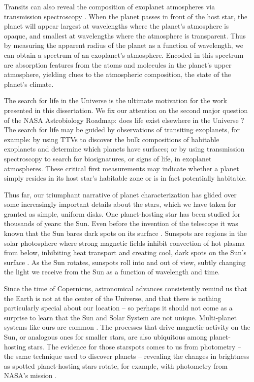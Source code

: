 Transits can also reveal the composition of exoplanet atmospheres via transmission spectroscopy \citep{Seager2000}. When the planet passes in front of the host star, the planet will appear largest at wavelengths where the planet's atmosphere is opaque, and smallest at wavelengths where the atmosphere is transparent. Thus by measuring the apparent radius of the planet as a function of wavelength, we can obtain a spectrum of an exoplanet's atmosphere. Encoded in this spectrum are absorption features from the atoms and molecules in the planet's upper atmosphere, yielding clues to the atmospheric composition, the state of the planet's climate. 

The search for life in the Universe is the ultimate motivation for the work presented in this dissertation. We fix our  attention on the second major question of the NASA Astrobiology Roadmap: does life exist elsewhere in the Universe \citep{DesMarais2008}? The search for life may be guided by observations of transiting exoplanets, for example: by using TTVs to discover the bulk compositions of habitable exoplanets and determine which planets have surfaces; or by using transmission spectroscopy to search for biosignatures, or signs of life, in exoplanet atmospheres. These critical first measurements may indicate whether a planet simply resides in its host star's habitable zone or is in fact potentially habitable. 

Thus far, our triumphant narrative of planet characterization has glided over some increasingly important details about the stars, which we have taken for granted as simple, uniform disks. One planet-hosting star has been studied for thousands of years: the Sun. Even before the invention of the telescope it was known that the Sun bares dark spots on its surface \citep{Hayakawa2017}. Sunspots are regions in the solar photosphere where strong magnetic fields inhibit convection of hot plasma from below, inhibiting heat transport and creating cool, dark spots on the Sun's surface \citep{Solanki2003}. As the Sun rotates, sunspots roll into and out of view, subtly changing the light we receive from the Sun as a function of wavelength and time.

Since the time of Copernicus, astronomical advances consistently remind us that the Earth is not at the center of the Universe, and that there is nothing particularly special about our location \citep{Copernicus1543} -- so perhaps it should not come as a surprise to learn that the Sun and Solar System are not unique. Multi-planet systems like ours are common \citep{Dressing2013,Burke2015,Coughlin2016}. The processes that drive magnetic activity on the Sun, or analogous ones for smaller stars, are also ubiquitous among planet-hosting stars. The evidence for those starspots comes to us from photometry -- the same technique used to discover planets -- revealing the changes in brightness as spotted planet-hosting stars rotate, for example, with photometry from NASA's \kepler mission \citep{Walkowicz2013,McQuillan2013,Giles2017}.  

